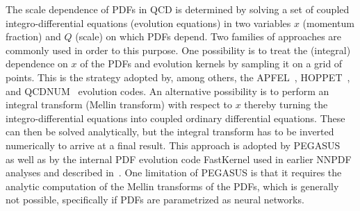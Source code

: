 The scale dependence of PDFs in QCD is determined by solving a set
of coupled integro-differential equations (evolution equations) in two
variables $x$ (momentum fraction) and $Q$ (scale) on which PDFs depend.
Two families of approaches are commonly used in order to this purpose.
%
One possibility is to treat the (integral) dependence on $x$ of the
PDFs and evolution kernels by
sampling it on a grid of points.
%
This is the strategy adopted by, among others, the  {\sc\small APFEL}~,
{\sc\small HOPPET}~,
and {\sc\small QCDNUM}~ evolution codes.
%
An alternative possibility is to perform an integral transform (Mellin
transform) with
respect to $x$ thereby turning the integro-differential equations into
coupled ordinary differential equations. These can then be solved
analytically, but the integral transform has to be inverted numerically
to arrive at a final result.
%
This approach is adopted by {\sc\small PEGASUS}~ as well as by the
internal PDF evolution code {\sc\small FastKernel} used in earlier NNPDF analyses
and described in~.
%
One limitation of {\sc\small PEGASUS} is that it requires the analytic
computation of the Mellin transforms of
the PDFs, which is generally not possible, specifically if PDFs are
parametrized as neural networks.
%

